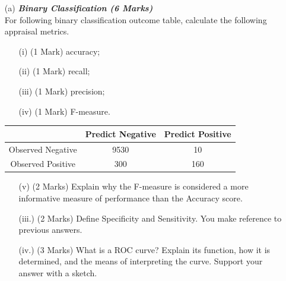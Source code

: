 \documentclass[a4paper,12pt]{article}
\begin{document}
\begin{itemize}
	\item[(a)] \textbf{\textit{Binary Classification (6 Marks)}}\\
	For following binary classification outcome table, calculate the following appraisal metrics.
	\begin{itemize}	
		\item[(i)] (1 Mark)	accuracy;
		\item[(ii)] (1 Mark)	recall;
		\item[(iii)] (1 Mark)	precision;
		\item[(iv)] (1 Mark)	F-measure.
	\end{itemize}	
	
	\begin{center}
		\begin{tabular}{|c|c|c|}
			\hline  & \phantom{spa}Predict Negative\phantom{spa} & \phantom{spa}Predict Positive\phantom{spa} \\ 
			\hline\phantom{spa} Observed Negative \phantom{spa}&	9530	&	10	\\ 
			\hline \phantom{spa}Observed Positive\phantom{spa} & 	300	&	160	\\ 
			\hline 
		\end{tabular} 
	\end{center}
	
	\begin{itemize}	
		\item[(v)] (2 Marks) Explain why the F-measure is considered a more informative measure of performance than the Accuracy score.
			\item[(iii.)](2 Marks) Define Specificity and Sensitivity. You make reference to previous answers.
			\item[(iv.)](3 Marks) What is a ROC curve? Explain its function, how it is determined, and the means of interpreting the curve. Support your answer with a sketch.
	\end{itemize}

\end{itemize}


\newpage


\end{document}
